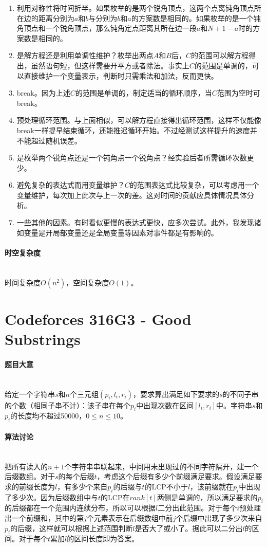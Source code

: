 \documentclass[UTF8]{ctexart}
\newcommand{\myparagraph}[1]{\paragraph{#1}\mbox{}\\}
\theoremstyle{nonumberplain}
\begin{document}
			\begin{enumerate}
				\item 利用对称性将时间折半。如果枚举的是两个锐角顶点，这两个点离钝角顶点所在边的距离分别为$a$和$b$与分别为$b$和$a$的方案数是相同的。如果枚举的是一个钝角顶点和一个锐角顶点，那么钝角定点距离其所在边一段$a$和$N+1-a$时的方案数是相同的。
				\item 是解方程还是利用单调性维护？枚举出两点$A$和$B$后，$C$的范围可以解方程得出，虽然语句短，但这样需要开平方或者除法。事实上$C$的范围是单调的，可以直接维护一个变量表示，判断时只需乘法和加法，反而更快。
				\item break。因为上述$C$的范围是单调的，制定适当的循环顺序，当$C$范围为空时可break。
				\item 预处理循环范围。与上面相似，可以解方程直接得出循环范围，这样不仅能像break一样提早结束循环，还能推迟循环开始。不过经测试这样提升的速度并不能超过随机误差。
				\item 是枚举两个锐角点还是一个钝角点一个锐角点？经实验后者所需循环次数更少。
				\item 避免复杂的表达式而用变量维护？$C$的范围表达式比较复杂，可以考虑用一个变量维护，每次加上此次与上一次的差。这对时间的贡献应具体情况具体分析。
				\item 一些其他的因素。有时看似更慢的表达式更快，应多次尝试。此外，我发现诸如变量是开局部变量还是全局变量等因素对事件都是有影响的。
				
			\end{enumerate}
		
		\myparagraph{时空复杂度}
		
			时间复杂度$O(n^2)$，空间复杂度$O(1)$。
	
	\section{Codeforces 316G3 - Good Substrings}
		
		\myparagraph{题目大意}
		
			给定一个字符串$s$和$n$个三元组$(p_i,l_i,r_i)$，要求算出满足如下要求的$s$的不同子串的个数（相同子串不计）：该子串在每个$p_i$中出现次数在区间$[l_i,r_i]$中。字符串$s$和$p_i$的长度均不超过50000，$0 \leq n \leq 10$。
		
		\myparagraph{算法讨论}
		
			把所有读入的$n+1$个字符串串联起来，中间用未出现过的不同字符隔开，建一个后缀数组。对于$s$的每个后缀$t$，考虑这个后缀有多少个前缀满足要求。假设满足要求的前缀长度为$l$，有多少个来自$p_i$的后缀与$t$的LCP不小于$l$，该前缀就在$p_i$中出现了多少次。因为后缀数组中与$t$的LCP在$rank[t]$两侧是单调的，所以满足要求的$p_i$的后缀都在一个范围内连续分布，所以可以根据$l$二分出此范围。对于每个$i$预处理出一个前缀和，其中的第$j$个元素表示在后缀数组中前$j$个后缀中出现了多少次来自$p_i$的后缀，这样就可以根据上述范围判断$l$是否大了或小了。据此可以二分出$l$的区间。对于每个$t$累加$l$的区间长度即为答案。
		
\end{document}
